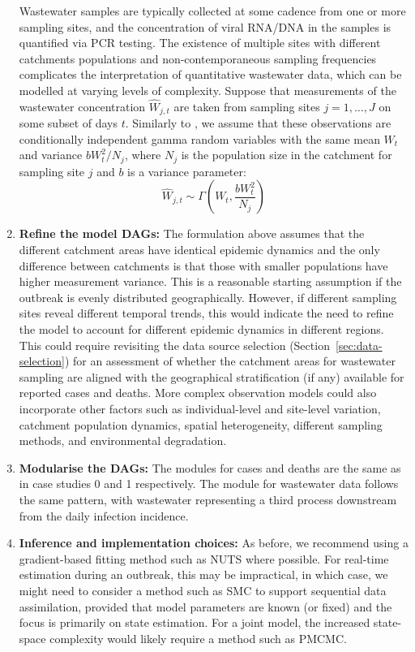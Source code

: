 \documentclass{article}
\begin{document}
\begin{enumerate}
   Wastewater samples are typically collected at some cadence from one or more sampling sites, and the concentration of viral RNA/DNA in the samples is quantified via PCR testing. The existence of multiple sites with different catchments populations and non-contemporaneous sampling frequencies complicates the interpretation of quantitative wastewater data, which can be modelled at varying levels of complexity.   
   Suppose that measurements of the wastewater concentration $\hat{W}_{j,t}$ are taken from sampling sites $j=1,\ldots, J$ on some subset of days $t$. Similarly to \citep{watson2024jointly}, we assume that these observations are conditionally independent gamma random variables with the same mean $W_t$ and variance $b W_t^2/N_j$, where $N_j$ is the population size in the catchment for sampling site $j$ and $b$ is a variance parameter:
    \begin{equation}
        \hat{W}_{j,t} \sim \Gamma\left( W_t,  \frac{b W_t^2}{N_j} \right)
    \end{equation}

       
\item \textbf{Refine the model DAGs:}  The formulation above assumes that the different catchment areas have identical epidemic dynamics and the only difference between catchments is that those with smaller populations have higher measurement variance. This is a reasonable starting assumption if the outbreak is evenly distributed geographically. However, if different sampling sites reveal different temporal trends, this would indicate the need to refine the model to account for different epidemic dynamics in different regions. This could require revisiting the data source selection (Section~\ref{sec:data-selection}) for an assessment of whether the catchment areas for wastewater sampling are aligned with the geographical stratification (if any) available for reported cases and deaths. More complex observation models could also incorporate other factors such as individual-level and site-level variation, catchment population dynamics, spatial heterogeneity, different sampling methods, and environmental degradation.

\item \textbf{Modularise the DAGs:} The modules for cases and deaths are the same as in case studies 0 and 1 respectively. The module for wastewater data follows the same pattern, with wastewater representing a third process downstream from the daily infection incidence.
    
    \item \textbf{Inference and implementation choices:} As before, we recommend using a gradient-based fitting method such as NUTS where possible. For real-time estimation during an outbreak, this may be impractical, in which case, we might need to consider a method such as SMC to support sequential data assimilation, provided that model parameters are known (or fixed) and the focus is primarily on state estimation.  For a joint model, the increased state-space complexity would likely require a method such as PMCMC.


\end{enumerate}
\end{document}
